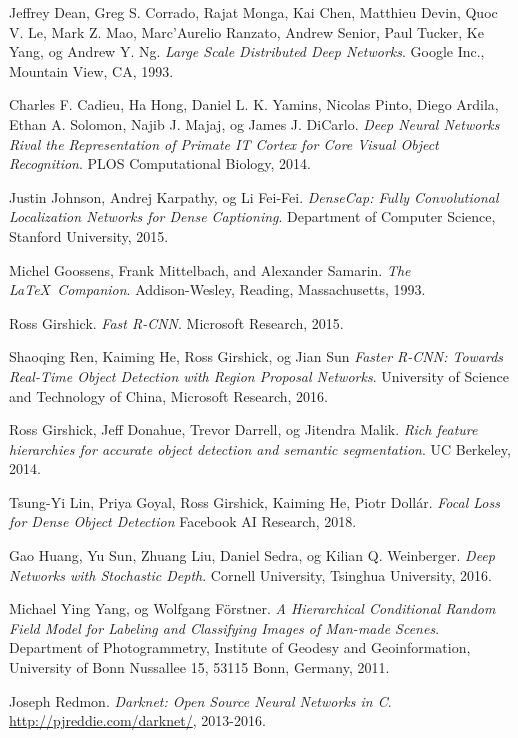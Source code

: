 \documentclass[11ot]{article}
\begin{document}
\begin{thebibliography}{9}
Jeffrey Dean, Greg S. Corrado, Rajat Monga, Kai Chen, Matthieu Devin, Quoc V. Le, Mark Z. Mao, Marc’Aurelio Ranzato, Andrew Senior, Paul Tucker, Ke Yang, og Andrew Y. Ng. 
\textit{Large Scale Distributed Deep Networks}. 
Google Inc., Mountain View, CA, 1993.

Charles F. Cadieu, Ha Hong, Daniel L. K. Yamins, Nicolas Pinto, Diego Ardila, Ethan A. Solomon,
Najib J. Majaj, og James J. DiCarlo. 
\textit{Deep Neural Networks Rival the Representation of Primate IT Cortex for Core Visual Object Recognition}. 
PLOS Computational Biology, 2014.

Justin Johnson, Andrej Karpathy, og Li Fei-Fei. 
\textit{DenseCap: Fully Convolutional Localization Networks for Dense Captioning}. 
Department of Computer Science, Stanford University, 2015.

Michel Goossens, Frank Mittelbach, and Alexander Samarin. 
\textit{The \LaTeX\ Companion}. 
Addison-Wesley, Reading, Massachusetts, 1993.

Ross Girshick. 
\textit{Fast R-CNN}. 
Microsoft Research, 2015.

Shaoqing Ren, Kaiming He, Ross Girshick, og Jian Sun
\textit{Faster R-CNN: Towards Real-Time Object Detection with Region Proposal Networks}. 
University of Science and Technology of China, Microsoft Research, 2016.

Ross Girshick, Jeff Donahue, Trevor Darrell, og Jitendra Malik. 
\textit{Rich feature hierarchies for accurate object detection and semantic segmentation}. 
UC Berkeley, 2014.

Tsung-Yi Lin, Priya Goyal, Ross Girshick, Kaiming He, Piotr Dollár.
\textit{Focal Loss for Dense Object Detection}
Facebook AI Research, 2018.

Gao Huang, Yu Sun, Zhuang Liu, Daniel Sedra, og Kilian Q. Weinberger. 
\textit{Deep Networks with Stochastic Depth}. 
Cornell University, Tsinghua University, 2016.

Michael Ying Yang, og Wolfgang Förstner. 
\textit{A Hierarchical Conditional Random Field Model for Labeling and Classifying Images of Man-made Scenes}. 
Department of Photogrammetry, Institute of Geodesy and Geoinformation, University of Bonn Nussallee 15, 53115 Bonn, Germany, 2011.

Joseph Redmon. 
\textit{Darknet: Open Source Neural Networks in C}. 
\url{http://pjreddie.com/darknet/}, 2013-2016.


\end{thebibliography}
\end{document}
